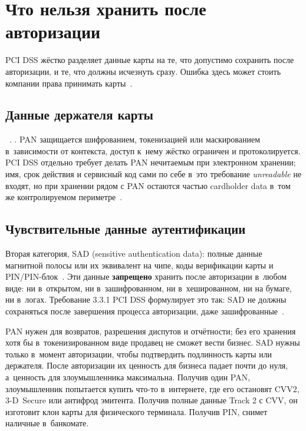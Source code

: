 \section{Что нельзя хранить после авторизации}\label{sec:card-data-storage}

PCI DSS жёстко разделяет данные карты на те, что допустимо
сохранить после авторизации, и те, что должны исчезнуть сразу.
Ошибка здесь может стоить компании права принимать карты~\cite{pci-dss-4}.

\subsection*{Данные держателя карты}

~\cite{pci-faq-1335}.
. PAN защищается шифрованием, токенизацией
или маскированием в~зависимости от контекста, доступ к~нему жёстко
ограничен и протоколируется. PCI DSS отдельно требует делать
PAN нечитаемым при электронном хранении; имя, срок действия
и сервисный код сами по себе в~это требование \textit{unreadable} не входят,
но при хранении рядом с PAN остаются частью cardholder data
в~том же контролируемом периметре~\cite{pci-dss-4,pci-faq-1222}.

\subsection*{Чувствительные данные аутентификации}

Вторая категория, SAD (sensitive authentication data):
полные данные магнитной полосы или их эквивалент на чипе,
коды верификации карты и PIN/PIN-блок~\cite{pci-faq-1335}. Эти данные
\textbf{запрещено} хранить после авторизации в~любом виде:
ни в~открытом, ни в~зашифрованном, ни в~хешированном, ни на бумаге,
ни в~логах. Требование 3.3.1 PCI DSS формулирует это так:
SAD не должны сохраняться после завершения процесса авторизации,
даже зашифрованные~\cite{pci-dss-4,pci-faq-1280}.

PAN нужен для возвратов, разрешения диспутов и отчётности; без его
хранения хотя бы в~токенизированном виде продавец не сможет вести
бизнес. SAD нужны только в~момент
авторизации, чтобы подтвердить подлинность карты или держателя.
После авторизации их ценность для бизнеса падает почти до нуля,
а~ценность для злоумышленника максимальна. Получив один PAN,
злоумышленник попытается купить что-то в~интернете, где его остановят
CVV2, \mbox{3-D Secure} или антифрод эмитента. Получив полные данные Track 2 с CVV, он изготовит
клон карты для физического терминала. Получив PIN, снимет наличные
в~банкомате.

